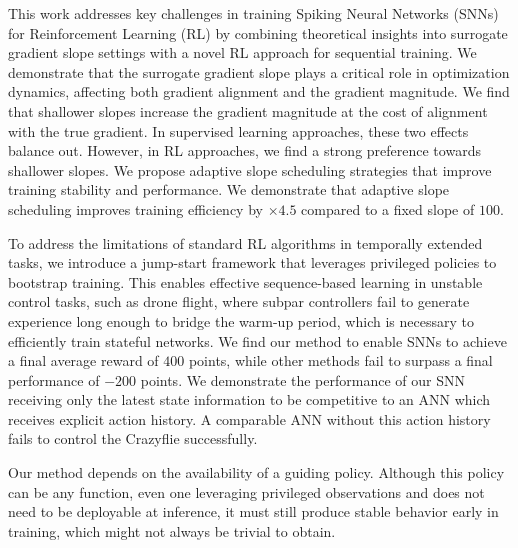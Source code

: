 This work addresses key challenges in training Spiking Neural Networks (SNNs) for Reinforcement Learning (RL) by combining theoretical insights into surrogate gradient slope settings with a novel RL approach for sequential training. We demonstrate that the surrogate gradient slope plays a critical role in optimization dynamics, affecting both gradient alignment and the gradient magnitude. We find that shallower slopes increase the gradient magnitude at the cost of alignment with the true gradient. In supervised learning approaches, these two effects balance out. However, in RL approaches, we find a strong preference towards shallower slopes. We propose adaptive slope scheduling strategies that improve training stability and performance. We demonstrate that adaptive slope scheduling improves training efficiency by $\times4.5$ compared to a fixed slope of $100$.

To address the limitations of standard RL algorithms in temporally extended tasks, we introduce a jump-start framework that leverages privileged policies to bootstrap training. This enables effective sequence-based learning in unstable control tasks, such as drone flight, where subpar controllers fail to generate experience long enough to bridge the warm-up period, which is necessary to efficiently train stateful networks. We find our method to enable SNNs to achieve a final average reward of $400$ points, while other methods fail to surpass a final performance of $-200$ points. We demonstrate the performance of our SNN receiving only the latest state information to be competitive to an ANN which receives explicit action history. A comparable ANN without this action history fails to control the Crazyflie successfully. 

Our method depends on the availability of a guiding policy. Although this policy can be any function, even one leveraging privileged observations and does not need to be deployable at inference, it must still produce stable behavior early in training, which might not always be trivial to obtain.





